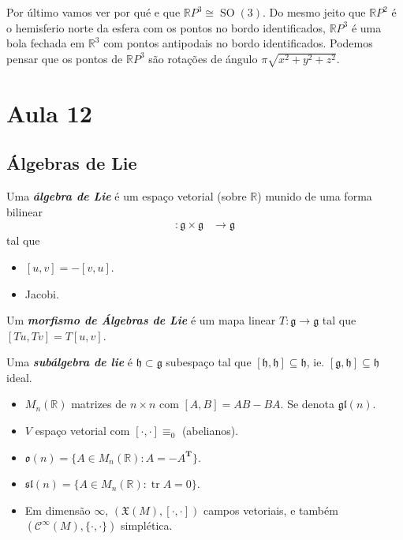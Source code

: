 Por \'ultimo vamos ver por qu\'e e que $\mathbb{R}P^{3}\cong \operatorname{SO}(3)$. Do mesmo jeito que $\mathbb{R}P^{2}$ \'e o hemisferio norte da esfera com os pontos no bordo identificados, $\mathbb{R}P^{3}$ \'e uma bola fechada em $\mathbb{R}^3$ com pontos antipodais no bordo identificados. Podemos pensar que os pontos de $\mathbb{R}P^{3}$ s\~ao rota\c c\~oes  de \'angulo $\pi\sqrt{x^2+y^2+z^2}$.


\section{Aula 12}

\subsection{\'Algebras de Lie}

\begin{defn}
	Uma \textit{\textbf{\'algebra de Lie}} \'e um espaço vetorial (sobre $\mathbb{R}$) munido de uma forma bilinear 
	\begin{align*}
		[\cdot,\cdot ]: \mathfrak{g} \times \mathfrak{g} &\longrightarrow \mathfrak{g}
	\end{align*}
tal que
\begin{itemize}
	\item $[u,v]=-[v,u]$.
	 \item Jacobi.
\end{itemize}

Um \textit{\textbf{morfismo de \'Algebras de Lie}} \'e um mapa linear $T:\mathfrak{g} \to \mathfrak{g}$ tal que $[Tu,Tv]=T[u,v]$.

Uma  \textit{\textbf{sub\'algebra de lie}} \'e $\mathfrak{h} \subset \mathfrak{g}$ subespaço tal que $[\mathfrak{h},\mathfrak{h} ]\subseteq\mathfrak{h}$, ie. $[\mathfrak{g},\mathfrak{h} ]\subseteq \mathfrak{h}$ ideal.
\end{defn}

\begin{example}\leavevmode 
	\begin{itemize}
		\item $M_n(\mathbb{R})$ matrizes de $n\times n$ com $[A,B]=AB-BA$. Se denota  $\mathfrak{gl}(n)$.

		\item $V$ espaço vetorial com $[\cdot,\cdot ]\equiv_0$ (abelianos).

		\item $\mathfrak{o}(n) =\{A\in M_n(\mathbb{R}):A=-A^{\mathbf{T}}\}$.

		\item $\mathfrak{sl}(n) =\{A\in M_n(\mathbb{R}):\operatorname{tr}A=0\}$.

		\item Em dimens\~ao $\infty$, $(\mathfrak{X}(M),[ \cdot,\cdot ])$ campos vetoriais, e tamb\'em $(\mathcal{C}^\infty(M),\{\cdot,\cdot\} )$ simpl\'etica.
	\end{itemize}
\end{example}

